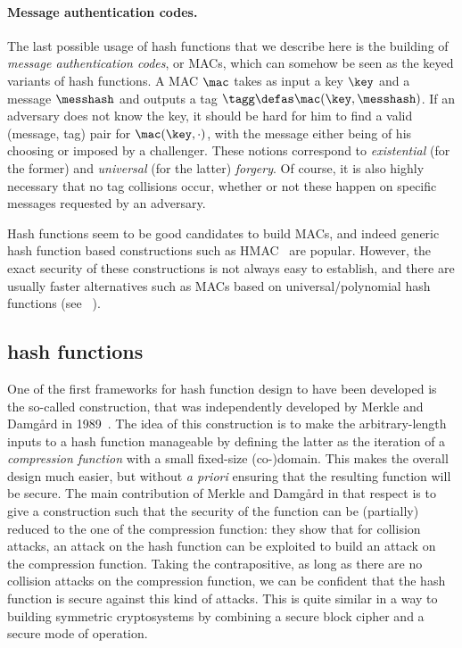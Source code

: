 \paragraph{Message authentication codes.} The last possible usage of hash functions that we describe here is the building of \emph{message authentication codes}, or MACs, which
can somehow be seen as the keyed variants of hash functions. A MAC $\mac$ takes as input a key $\key$ and a message $\messhash$ and outputs a tag $\tagg \defas \mac(\key, \messhash)$.
If an adversary does not know the key, it should be hard for him to find a valid (message, tag) pair for $\mac(\key, \cdot)$, with the message either being of his choosing
or imposed by a challenger. These notions correspond to \emph{existential} (for the former) and \emph{universal} (for the latter) \emph{forgery}. Of course, it is also
highly necessary that no tag collisions occur, whether or not these happen on specific messages requested by an adversary.

Hash functions seem to be good candidates to build MACs, and indeed generic hash function based constructions such as HMAC~\cite{DBLP:conf/crypto/BellareCK96} are popular. However, the exact security of
these constructions is not always easy to establish, and there are usually faster alternatives such as MACs based on universal/polynomial hash functions (see \eg~\cite{DBLP:conf/crypto/BlackHKKR99}).

\subsection{\merkdam hash functions}

One of the first frameworks for hash function design to have been developed is the so-called \merkdam construction, that was independently developed by
Merkle and Damg\aa rd in 1989~\cite{DBLP:conf/crypto/Merkle89a,DBLP:conf/crypto/Damgard89a}. The idea of this construction is to make the arbitrary-length
inputs to a hash function manageable by defining the latter as the iteration of a \emph{compression function} with a small fixed-size (co-)domain.
This makes the overall design much easier, but without \emph{a priori} ensuring that the resulting function will be secure. The main contribution of
Merkle and Damg\aa rd in that respect is to give a construction such that the security of the function can be (partially) reduced to the one of
the compression function: they show that for \eg collision attacks, an attack on the hash function can be exploited to build an attack on the compression function.
Taking the contrapositive, as long as there are no collision attacks on the compression function, we can be confident that the hash function is secure against this kind of attacks.
This is quite similar in a way to building symmetric cryptosystems by combining a secure block cipher and a secure mode of operation.

